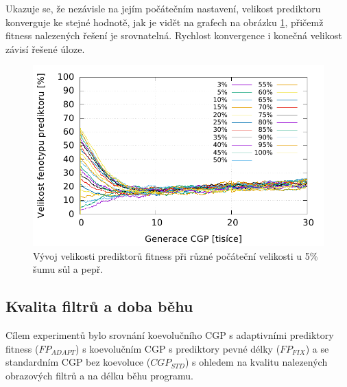 \documentclass[fleqn,11pt]{ExcelAtFIT} %
\begin{document}
Ukazuje se, že nezávisle na jejím počátečním nastavení, velikost prediktoru konverguje ke stejné hodnotě, jak je vidět na grafech na obrázku \ref{fig:InitialSize}, přičemž fitness nalezených řešení je srovnatelná. Rychlost konvergence i konečná velikost závisí řešené úloze.


\begin{figure}[h]
    \centering
    \includegraphics[width=0.95\linewidth]{images/initial-size-5-30kg.pdf}
    \caption{Vývoj velikosti prediktorů fitness při různé počáteční velikosti u 5\% šumu sůl a pepř.}
    \label{fig:InitialSize}
\end{figure}

\subsection{Kvalita filtrů a doba běhu}

Cílem experimentů bylo srovnání koevolučního CGP s adaptivními prediktory fitness ($\mathit{FP_{ADAPT}}$) s koevolučním CGP s prediktory pevné délky ($\mathit{FP_{FIX}}$) a se standardním CGP bez koevoluce ($\mathit{CGP_{STD}}$) s ohledem na kvalitu nalezených obrazových filtrů a na délku běhu programu.
\end{document}

